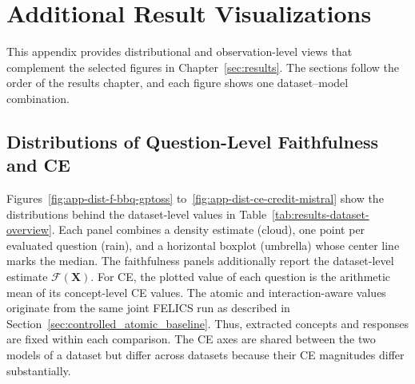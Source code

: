 \chapter{Additional Result Visualizations}
\label{app:additional-result-visualizations}






This appendix provides distributional and observation-level views that complement the selected figures in Chapter~\ref{sec:results}. The sections follow the order of the results chapter, and each figure shows one dataset--model combination.

\section{Distributions of Question-Level Faithfulness and CE}
\label{app:distributions}

Figures~\ref{fig:app-dist-f-bbq-gptoss} to~\ref{fig:app-dist-ce-credit-mistral} show the distributions behind the dataset-level values in Table~\ref{tab:results-dataset-overview}. Each panel combines a density estimate (cloud), one point per evaluated question (rain), and a horizontal boxplot (umbrella) whose center line marks the median. The faithfulness panels additionally report the dataset-level estimate $\mathcal{F}(\mathbf{X})$. For CE, the plotted value of each question is the arithmetic mean of its concept-level CE values. The atomic and interaction-aware values originate from the same joint FELICS run as described in Section~\ref{sec:controlled_atomic_baseline}. Thus, extracted concepts and responses are fixed within each comparison. The CE axes are shared between the two models of a dataset but differ across datasets because their CE magnitudes differ substantially.

\ifthesislocalbuild
  
  
  \tikzexternalenable

  \newcommand{\AppendixDistributionFigure}[8]{%
    \begin{figure}[H]
      \centering
      \ResultFigureHalf{%
        \FaithfulnessRaincloudPanel{data/summary/question_level_faithfulness_#4.csv}{#5}}%
        {Faithfulness distribution for #1 with #2}%
        {Question-level faithfulness for #1 with #2 under atomic and joint attribution.}%
        {fig:app-dist-f-#5}%
      \hfill
      \ResultFigureHalf{%
        \CeRaincloudPanel{data/appendix/ce_shifts/#3.csv}{#5}{#6}{#7}{#8}}%
        {CE distribution for #1 with #2}%
        {Question-averaged CE for #1 with #2 under atomic and joint attribution.}%
        {fig:app-dist-ce-#5}%
    \end{figure}%
  }

